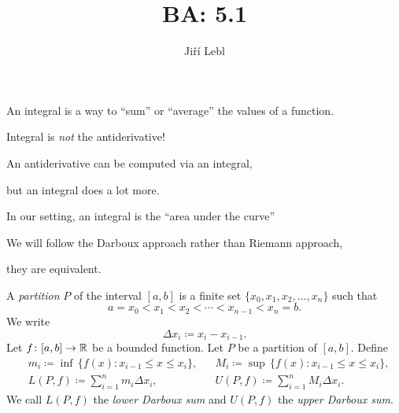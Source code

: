 \documentclass[10pt,aspectratio=149]{beamer}
\author{Ji\v{r}\'i Lebl}
\institute[OSU]{%
Departemento pri Matematiko de Oklahoma {\^S}tata Universitato}
\title{BA: 5.1}
\date{}
\begin{document}
\begin{frame}
\titlepage
\end{frame}

\begin{frame}
An integral is a way to ``sum'' or ``average'' the values of a function.

\pause
\medskip

Integral is \emph{not} the antiderivative!

\pause
\medskip

An antiderivative can be computed via an integral,

\pause
but an integral does a lot more.

\pause
\medskip

In our setting, an integral is the ``area under the curve''

\pause
\medskip

We will follow the Darboux approach rather than Riemann approach,

they are equivalent.
\end{frame}

\begin{frame}

\begin{definition}
A \emph{partition} $P$ of the interval $[a,b]$ is
a finite set $\{ x_0,x_1,x_2,\ldots,x_n \}$ such that
\begin{equation*}
a = x_0 < x_1 < x_2 < \cdots < x_{n-1} < x_n = b .
\end{equation*}
\pause
We write
\begin{equation*}
\Delta x_i \coloneqq x_i - x_{i-1} .
\end{equation*}
\pause
Let $f \colon [a,b] \to {\mathbb{R}}$ be a bounded function.
\pause
Let $P$ be a partition of
$[a,b]$.
\pause
Define
\begin{align*}
& m_i \coloneqq \inf \, \bigl\{ f(x) : x_{i-1} \leq x \leq x_i \bigr\} , &
& M_i \coloneqq \sup \, \bigl\{ f(x) : x_{i-1} \leq x \leq x_i \bigr\} , \\
& L(P,f) \coloneqq
\sum_{i=1}^n m_i \Delta x_i , &
& U(P,f) \coloneqq
\sum_{i=1}^n M_i \Delta x_i .
\end{align*}
\pause
We call $L(P,f)$ the \emph{lower Darboux sum} and
$U(P,f)$ the \emph{upper Darboux sum}.
\end{definition}

\end{frame}
\end{document}
